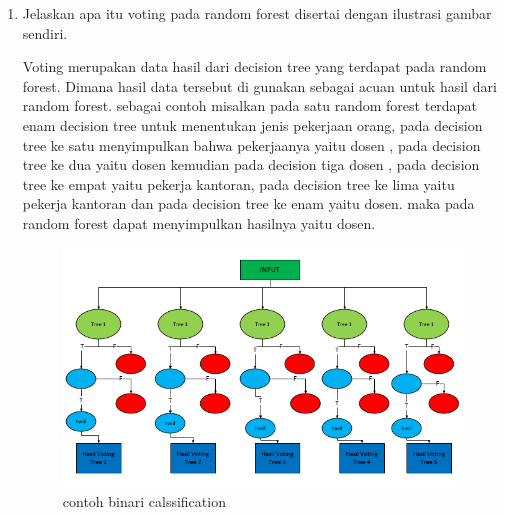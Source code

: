 \begin{enumerate}
\item Jelaskan apa itu voting pada random forest disertai dengan ilustrasi gambar sendiri.\par
Voting merupakan data hasil dari decision tree yang terdapat pada random forest. Dimana hasil data tersebut di gunakan sebagai acuan untuk hasil dari random forest. sebagai contoh misalkan pada satu random forest terdapat enam decision tree untuk menentukan jenis pekerjaan orang, pada decision tree ke satu menyimpulkan bahwa pekerjaanya yaitu dosen , pada decision tree ke dua yaitu dosen kemudian pada decision tiga dosen , pada decision tree ke empat yaitu pekerja kantoran, pada decision tree ke lima yaitu pekerja kantoran dan pada decision tree ke enam yaitu dosen. maka pada random forest dapat menyimpulkan hasilnya yaitu dosen. 
\begin{figure}[ht]
\centering
\includegraphics[scale=0.2]{figures/1174042/chapter3/1,3.PNG}
\caption{contoh binari calssification}
\label{contoh}
\end{figure}

\end{enumerate}


